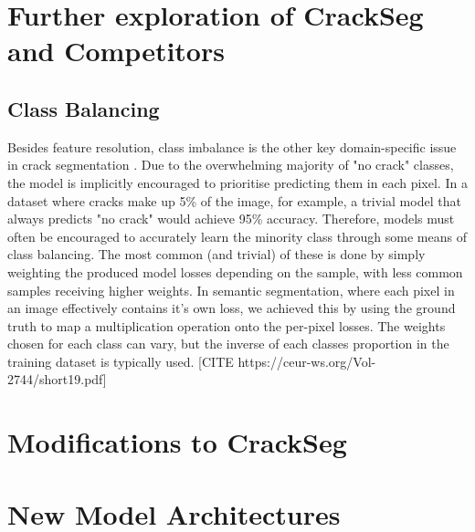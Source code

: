 \documentclass[a4paper,12pt]{report}
\begin{document}
    \section{Further exploration of CrackSeg and Competitors} %
    \subsection{Class Balancing}
    Besides feature resolution, class imbalance is the other key domain-specific issue in crack segmentation \cite{hamishebahar_comprehensive_2022}. Due to the overwhelming majority of "no crack" classes, the model is implicitly encouraged to prioritise predicting them in each pixel. In a dataset where cracks make up 5\% of the image, for example, a trivial model that always predicts "no crack" would achieve 95\% accuracy. Therefore, models must often be encouraged to accurately learn the minority class through some means of class balancing. The most common (and trivial) of these is done by simply weighting the produced model losses depending on the sample, with less common samples receiving higher weights. In semantic segmentation, where each pixel in an image effectively contains it's own loss, we achieved this by using the ground truth to map a multiplication operation onto the per-pixel losses. The weights chosen for each class can vary, but the inverse of each classes proportion in the training dataset is typically used. [CITE https://ceur-ws.org/Vol-2744/short19.pdf]




\section{Modifications to CrackSeg}

\section{New Model Architectures}
\end{document}

